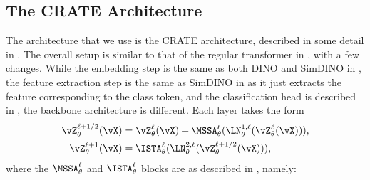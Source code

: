 \documentclass[../../book-main.tex]{subfiles}
\begin{document}
\subsection{The CRATE Architecture}\label{sub:image_classification_architecture}

The architecture that we use is the CRATE architecture, described in
some detail in . The overall setup is similar
to that of the regular transformer in
, with a few changes.
While the embedding step is the same as both DINO and SimDINO in
, the feature extraction
step is the same as SimDINO in
 as it just extracts the
feature corresponding to the class token, and the classification head
is described in , the
backbone architecture is different. Each layer takes the form
\begin{align}\label{eq:CRATE_updates}
\vZ_{\theta}^{\ell + 1/2}(\vX)
&= \vZ_{\theta}^{\ell}(\vX) + \MSSA_{\theta}^{\ell}(\LN_{\theta}^{1,
\ell}(\vZ_{\theta}^{\ell}(\vX))) , \\
\vZ_{\theta}^{\ell + 1}(\vX)
&= \ISTA_{\theta}^{\ell}(\LN_{\theta}^{2, \ell}(\vZ_{\theta}^{\ell +
1/2}(\vX))) ,
\end{align}
where the \(\MSSA_{\theta}^{\ell}\) and \(\ISTA_{\theta}^{\ell}\)
blocks are as described in , namely:
\end{document}
